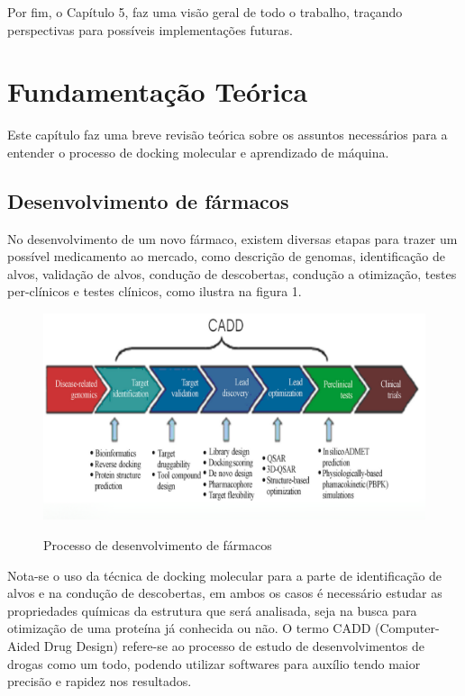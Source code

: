 \documentclass[tcc, capa]{texucpel}
\begin{document}
Por fim, o Capítulo 5, faz uma visão geral de todo o trabalho, traçando perspectivas para possíveis implementações futuras.

\chapter{Fundamentação Teórica}
Este capítulo faz uma breve revisão teórica sobre os assuntos necessários para a entender o processo de docking molecular  e aprendizado de máquina. 

\section{Desenvolvimento de fármacos}

No desenvolvimento de um novo fármaco, existem diversas etapas para trazer um possível medicamento ao mercado, como descrição de genomas, identificação de alvos, validação de alvos, condução de descobertas, condução a otimização, testes per-clínicos e testes clínicos, como ilustra na figura 1.

      \begin{figure}[!h]
      \centering
      \includegraphics[width=15cm]{imagens/cadd.png}   
      \caption{Processo de desenvolvimento de fármacos}
    \cite{kore2012computer}
	\end{figure}
    
Nota-se o uso da técnica de docking molecular para a parte de identificação de alvos e na condução de descobertas, em ambos os casos é necessário estudar as propriedades químicas da estrutura que será analisada, seja na busca para otimização de uma proteína já conhecida ou não. 
O termo CADD (Computer-Aided Drug Design) refere-se ao processo de estudo de desenvolvimentos de drogas como um todo, podendo utilizar softwares para auxílio tendo maior precisão e rapidez nos resultados.
\end{document}
